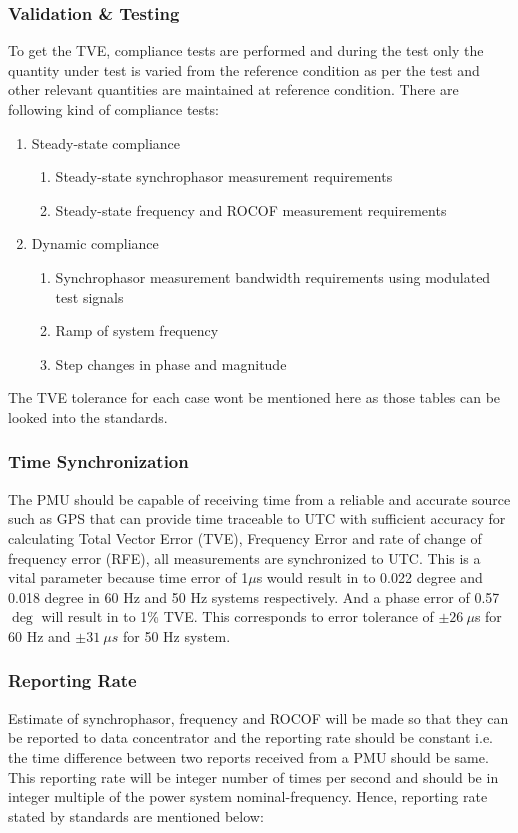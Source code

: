 \subsubsection{Validation \& Testing }

To get the TVE, compliance tests are performed and during the test only the quantity under test is varied from the reference condition as per the test and other relevant quantities are maintained at reference condition. There are following kind of compliance tests:
\begin{enumerate}
	\item Steady-state compliance
	\begin{enumerate}
		\item Steady-state synchrophasor measurement requirements
		\item Steady-state frequency and ROCOF measurement requirements
	\end{enumerate}
	\item Dynamic compliance
	\begin{enumerate}
		\item Synchrophasor measurement bandwidth requirements using modulated test signals
		\item Ramp of system frequency
		\item Step changes in phase and magnitude
	\end{enumerate}
\end{enumerate} 
The TVE tolerance for each case wont be mentioned here as those tables can be looked into the standards.


\subsubsection{Time Synchronization}

The PMU should be capable of receiving time from a reliable and accurate source such as GPS that can provide time traceable to UTC with sufficient accuracy for calculating Total Vector Error (TVE), Frequency Error and rate of change of frequency error (RFE), all measurements are synchronized to UTC.
This is a vital parameter because time error of 1$\mu$s would result in to 0.022 degree and 0.018 degree in 60 Hz and 50 Hz systems respectively. And a phase error of 0.57$\deg$ will result in to 1\% TVE. This corresponds to error tolerance of $\pm26 ~\mu$s for 60 Hz and $\pm 31 ~\mu s$ for 50 Hz system.

\subsubsection{Reporting Rate}
Estimate of synchrophasor, frequency and ROCOF will be made so that they can be reported to data concentrator and the reporting rate should be constant i.e. the time difference between two reports received from a PMU should be same. This reporting rate will be integer number of times per second and should be in integer multiple of the power system nominal-frequency. Hence, reporting rate stated by standards are mentioned below:


